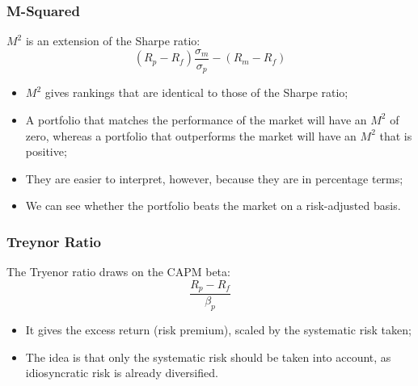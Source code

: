 \documentclass[11pt,a4paper]{report}
\begin{document}
\subsubsection{M-Squared}
$M^2$ is an extension of the Sharpe ratio:
\[ (R_p - R_f) \frac{\sigma_m}{\sigma_p} - (R_m - R_f) \]
\begin{itemize}
    \item $M^2$ gives rankings that are identical to those of the Sharpe ratio;
    \item A portfolio that matches the performance of the market will have an $M^2$ of zero, whereas a portfolio that outperforms the market will have an $M^2$ that is positive;
    \item They are easier to interpret, however, because they are in percentage terms;
    \item We can see whether the portfolio beats the market on a risk-adjusted basis.
\end{itemize}
\subsubsection{Treynor Ratio}
The Tryenor ratio draws on the CAPM beta:
\[\frac{R_p - R_f}{\beta_p}\]
\begin{itemize}
    \item It gives the excess return (risk premium), scaled by the systematic risk taken;
    \item The idea is that only the systematic risk should be taken into account, as idiosyncratic risk is already diversified.
\end{itemize}
\end{document}

